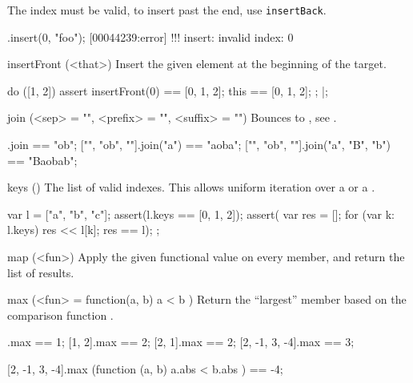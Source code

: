 \begin{urbiscriptapi}
  The index must be valid, to insert past the end, use
  \lstinline|insertBack|.
\begin{urbiscript}
[].insert(0, "foo");
[00044239:error] !!! insert: invalid index: 0
\end{urbiscript}


\item[insertFront](<that>)
  Insert the given element at the beginning of the target.

\begin{urbiscript}
do ([1, 2])
{
  assert
  {
    insertFront(0) == [0, 1, 2];
    this           == [0, 1, 2];
  };
}|;
\end{urbiscript}

\item[join](<sep> = "", <prefix> = "", <suffix> = "")
  Bounces to , see .

\begin{urbiassert}
["", "ob", ""].join                == "ob";
["", "ob", ""].join("a")           == "aoba";
["", "ob", ""].join("a", "B", "b") == "Baobab";
\end{urbiassert}

\item[keys]()
  The list of valid indexes.  This allows uniform iteration over a
   or a .

\begin{urbiscript}
{
  var l = ["a", "b", "c"];
  assert(l.keys == [0, 1, 2]);
  assert({
           var res = [];
           for (var k: l.keys)
             res << l[k];
           res
         }
         == l);
};
\end{urbiscript}

\item[map](<fun>)
Apply the given functional value on every member, and return the list
of results.


\item[max](<fun> = function(a, b) { a < b })
  Return the ``largest'' member based on the comparison function .
\begin{urbiassert}
           [1].max == 1;
        [1, 2].max == 2;
        [2, 1].max == 2;
[2, -1, 3, -4].max == 3;

[2, -1, 3, -4].max (function (a, b) { a.abs < b.abs }) == -4;
\end{urbiassert}


\end{urbiscriptapi}

